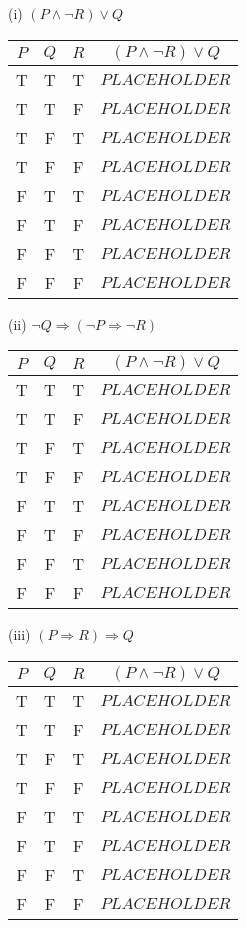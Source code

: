 \documentclass{article}
\begin{document}
(i) $(P \land \neg R) \lor Q$\\
\begin{tabular}{|c|c|c|c|}
    \hline
    $P$ & $Q$ & $R$ & $(P \land \neg R) \lor Q$ \\
    \hline
    T   & T   & T   & $PLACEHOLDER$             \\
    T   & T   & F   & $PLACEHOLDER$             \\
    T   & F   & T   & $PLACEHOLDER$             \\
    T   & F   & F   & $PLACEHOLDER$             \\
    F   & T   & T   & $PLACEHOLDER$             \\
    F   & T   & F   & $PLACEHOLDER$             \\
    F   & F   & T   & $PLACEHOLDER$             \\
    F   & F   & F   & $PLACEHOLDER$             \\
    \hline
\end{tabular}

(ii) $\neg Q \Rightarrow (\neg P \Rightarrow \neg R)$\\
\begin{tabular}{|c|c|c|c|}
    \hline
    $P$ & $Q$ & $R$ & $(P \land \neg R) \lor Q$ \\
    \hline
    T   & T   & T   & $PLACEHOLDER$             \\
    T   & T   & F   & $PLACEHOLDER$             \\
    T   & F   & T   & $PLACEHOLDER$             \\
    T   & F   & F   & $PLACEHOLDER$             \\
    F   & T   & T   & $PLACEHOLDER$             \\
    F   & T   & F   & $PLACEHOLDER$             \\
    F   & F   & T   & $PLACEHOLDER$             \\
    F   & F   & F   & $PLACEHOLDER$             \\
    \hline
\end{tabular}

(iii) $(P \Rightarrow R) \Rightarrow Q$\\
\begin{tabular}{|c|c|c|c|}
    \hline
    $P$ & $Q$ & $R$ & $(P \land \neg R) \lor Q$ \\
    \hline
    T   & T   & T   & $PLACEHOLDER$             \\
    T   & T   & F   & $PLACEHOLDER$             \\
    T   & F   & T   & $PLACEHOLDER$             \\
    T   & F   & F   & $PLACEHOLDER$             \\
    F   & T   & T   & $PLACEHOLDER$             \\
    F   & T   & F   & $PLACEHOLDER$             \\
    F   & F   & T   & $PLACEHOLDER$             \\
    F   & F   & F   & $PLACEHOLDER$             \\
    \hline
\end{tabular}
\end{document}
